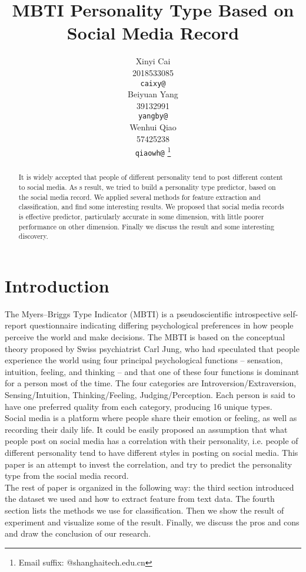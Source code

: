 \documentclass{article}
\title{MBTI Personality Type Based on Social Media Record}
\author{%
  Xinyi Cai\\
  2018533085\\
  \texttt{caixy@} \\
  \And
  Beiyuan Yang \\
  39132991 \\
  \texttt{yangby@} \\
  \And
  Wenhui Qiao \\
  57425238 \\
  \texttt{qiaowh@} \thanks{Email suffix: @shanghaitech.edu.cn} \\
}
\begin{document}
\maketitle

\begin{abstract}
It is widely accepted that people of different personality tend to post different content to social media. As s result, we tried to build a personality type predictor, based on the social media record. We applied several methods for feature extraction and classification, and find some interesting results. We proposed that social media records is effective predictor, particularly accurate in some dimension, with little poorer performance on other dimension. Finally we discuss the result and some interesting discovery.
\end{abstract}

\section{Introduction}
The Myers–Briggs Type Indicator (MBTI) is a pseudoscientific introspective self-report questionnaire indicating differing psychological preferences in how people perceive the world and make decisions. The MBTI is based on the conceptual theory proposed by Swiss psychiatrist Carl Jung, who had speculated that people experience the world using four principal psychological functions – sensation, intuition, feeling, and thinking – and that one of these four functions is dominant for a person most of the time. The four categories are Introversion/Extraversion, Sensing/Intuition, Thinking/Feeling, Judging/Perception. Each person is said to have one preferred quality from each category, producing 16 unique types. \\
Social media is a platform where people share their emotion or feeling, as well as recording their daily life. It could be easily proposed an assumption that what people post on social media has a correlation with their personality, i.e. people of different personality tend to have different styles in posting on social media. This paper is an attempt to invest the correlation, and try to predict the personality type from the social media record. \\
The rest of paper is organized in the following way: the third section introduced the dataset we used and how to extract feature from text data. The fourth section lists the methods we use for classification. Then we show the result of experiment and visualize some of the result. Finally, we discuss the pros and cons and draw the conclusion of our research.
\end{document}
